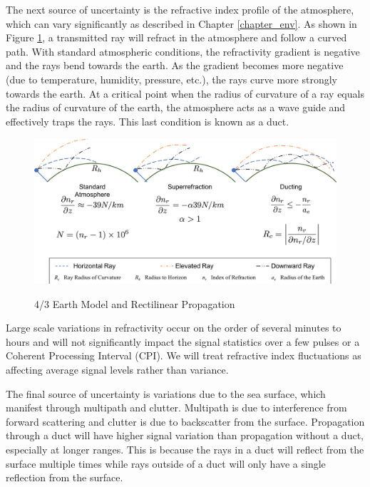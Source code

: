 The next source of uncertainty is the refractive index profile of the atmosphere, which can vary significantly as described in Chapter \ref{chapter_env}. As shown in Figure \ref{rmt_fig:2}, a transmitted ray will refract in the atmosphere and follow a curved path. With standard atmospheric conditions, the refractivity gradient is negative and the rays bend towards the earth. As the gradient becomes more negative (due to temperature, humidity, pressure, etc.), the rays curve more strongly towards the earth. At a critical point when the radius of curvature of a ray equals the radius of curvature of the earth, the atmosphere acts as a wave guide and effectively traps the rays. This last condition is known as a duct.
\begin{figure}[H]
  \begin{center}
\includegraphics[width=6in]{../media/multistatic/earth_refractivity.png}
  \end{center}
  \renewcommand{\baselinestretch}{1} \small\normalsize
  \begin{quote}
    \caption[4/3 Earth Model and Rectilinear Propagation]{4/3 Earth Model and Rectilinear Propagation\label{rmt_fig:2}}
  \end{quote}
\end{figure}
\renewcommand{\baselinestretch}{2} \small\normalsize
Large scale variations in refractivity occur on the order of several minutes to hours and will not significantly impact the signal statistics over a few pulses or a Coherent Processing Interval (CPI). We will treat refractive index fluctuations as affecting average signal levels rather than variance.

The final source of uncertainty is variations due to the sea surface, which manifest through multipath and clutter. Multipath is due to interference from forward scattering and clutter is due to backscatter from the surface. Propagation through a duct will have higher signal variation than propagation without a duct, especially at longer ranges. This is because the rays in a duct will reflect from the surface multiple times while rays outside of a duct will only have a single reflection from the surface.
